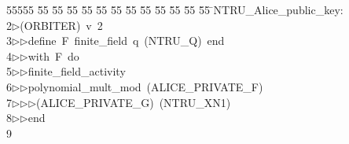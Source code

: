 %
%
\begin{tabbing}
55555 \= 55 \= 55 \= 55 \= 55 \= 55 \= 55 \= 55 \= 55 \= 55 \= 55 \= 55 \= 55 \= \>NTRU\_Alice\_public\_key:\\[0pt]
2\>$\triangleright$\>(ORBITER)\ v\ 2\ \\[0pt]
3\>$\triangleright$\>$\triangleright$\>define\ F\ finite\_field\ q\ (NTRU\_Q)\ end\ \\[0pt]
4\>$\triangleright$\>$\triangleright$\>with\ F\ do\ \\[0pt]
5\>$\triangleright$\>$\triangleright$\>finite\_field\_activity\ \\[0pt]
6\>$\triangleright$\>$\triangleright$\>polynomial\_mult\_mod\ (ALICE\_PRIVATE\_F)\ \\[0pt]
7\>$\triangleright$\>$\triangleright$\>$\triangleright$\>(ALICE\_PRIVATE\_G)\ (NTRU\_XN1)\ \\[0pt]
8\>$\triangleright$\>$\triangleright$\>end\\[0pt]
9\>\end{tabbing}
